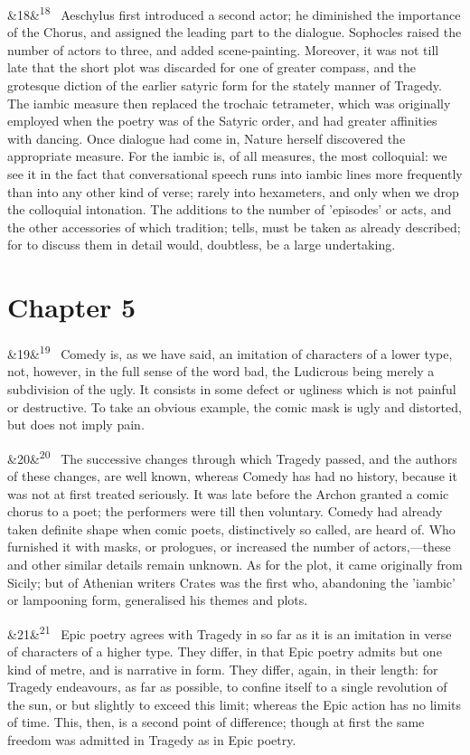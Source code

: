 \documentclass[12pt]{article}
\newcommand{\para}[1][]{\par\noindent\ifx&#1&\else\textsuperscript{\footnotesize #1}~\fi}
\begin{document}
\para[18] Aeschylus first introduced a second actor; he diminished the importance of the Chorus, and assigned the leading part to the dialogue. Sophocles raised the number of actors to three, and added scene-painting. Moreover, it was not till late that the short plot was discarded for one of greater compass, and the grotesque diction of the earlier satyric form for the stately manner of Tragedy. The iambic measure then replaced the trochaic tetrameter, which was originally employed when the poetry was of the Satyric order, and had greater affinities with dancing. Once dialogue had come in, Nature herself discovered the appropriate measure. For the iambic is, of all measures, the most colloquial: we see it in the fact that conversational speech runs into iambic lines more frequently than into any other kind of verse; rarely into hexameters, and only when we drop the colloquial intonation. The additions to the number of 'episodes' or acts, and the other accessories of which tradition; tells, must be taken as already described; for to discuss them in detail would, doubtless, be a large undertaking.

\section*{Chapter 5}

\para[19] Comedy is, as we have said, an imitation of characters of a lower type, not, however, in the full sense of the word bad, the Ludicrous being merely a subdivision of the ugly. It consists in some defect or ugliness which is not painful or destructive. To take an obvious example, the comic mask is ugly and distorted, but does not imply pain.

\para[20] The successive changes through which Tragedy passed, and the authors of these changes, are well known, whereas Comedy has had no history, because it was not at first treated seriously. It was late before the Archon granted a comic chorus to a poet; the performers were till then voluntary. Comedy had already taken definite shape when comic poets, distinctively so called, are heard of. Who furnished it with masks, or prologues, or increased the number of actors,---these and other similar details remain unknown. As for the plot, it came originally from Sicily; but of Athenian writers Crates was the first who, abandoning the 'iambic' or lampooning form, generalised his themes and plots.

\para[21] Epic poetry agrees with Tragedy in so far as it is an imitation in verse of characters of a higher type. They differ, in that Epic poetry admits but one kind of metre, and is narrative in form. They differ, again, in their length: for Tragedy endeavours, as far as possible, to confine itself to a single revolution of the sun, or but slightly to exceed this limit; whereas the Epic action has no limits of time. This, then, is a second point of difference; though at first the same freedom was admitted in Tragedy as in Epic poetry.
\end{document}
